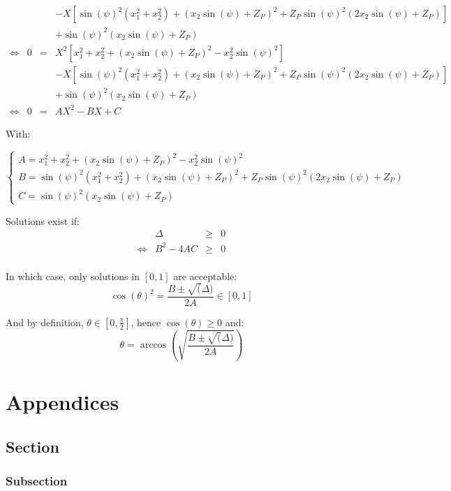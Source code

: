 \documentclass[a4paper,11pt,twoside,titlepage,openright]{book}
\numberwithin{equation}{section}
\newcommand{\lt}{\left}
\newcommand{\rt}{\right}
\begin{document}
$$\begin{array}{lllll}
    & & & - X\lt[ \sin(\psi)^2\lt(x_1^2+x_2^2\rt) + \lt(x_2\sin(\psi) + Z_P\rt)^2 + Z_P\sin(\psi)^2\lt(2x_2\sin(\psi) + Z_P\rt)\rt]\\
    & & & + \sin(\psi)^2\lt(x_2\sin(\psi) + Z_P\rt)\\
    \Leftrightarrow
    & 0 & = & X^2\lt[ x_1^2 + x_2^2 + \lt(x_2\sin(\psi) + Z_P\rt)^2 - x_2^2\sin(\psi)^2 \rt]\\
    & & & - X\lt[ \sin(\psi)^2\lt(x_1^2+x_2^2\rt) + \lt(x_2\sin(\psi) + Z_P\rt)^2 + Z_P\sin(\psi)^2\lt(2x_2\sin(\psi) + Z_P\rt)\rt]\\
    & & & + \sin(\psi)^2\lt(x_2\sin(\psi) + Z_P\rt)\\
    \Leftrightarrow
    & 0 & = & AX^2 - BX + C
\end{array}
$$

With:

$$
\lt\{
	\begin{array}{lll}
		A = x_1^2 + x_2^2 + \lt(x_2\sin(\psi) + Z_P\rt)^2 - x_2^2\sin(\psi)^2\\
		B = \sin(\psi)^2\lt(x_1^2+x_2^2\rt) + \lt(x_2\sin(\psi) + Z_P\rt)^2 + Z_P\sin(\psi)^2\lt(2x_2\sin(\psi) + Z_P\rt)\\
		C = \sin(\psi)^2\lt(x_2\sin(\psi) + Z_P\rt)
	\end{array}
\rt.
$$

Solutions exist if:
$$
\begin{array}{lllll}
    & \Delta & \geq & 0\\
    \Leftrightarrow
    & B^2 - 4AC & \geq & 0\\
\end{array}
$$

In which case, only solutions in $\lt[0,1\rt]$ are acceptable:
$$
\cos(\theta)^2 = \frac{B \pm \sqrt(\Delta)}{2A} \in \lt[0,1\rt]
$$

And by definition, $\theta \in \lt[0,\frac{\pi}{2}\rt]$, hence $\cos(\theta)\geq0$ and:
$$
\theta = \arccos\lt(\sqrt{\frac{B \pm \sqrt(\Delta)}{2A}}\rt)
$$


\appendix
\chapter{Appendices}

\section{Section}
\subsection{Subsection}
\end{document}
